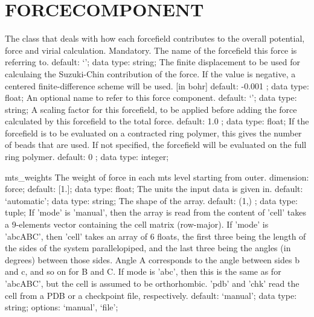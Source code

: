 \section{FORCECOMPONENT}
\label{FORCECOMPONENT}
\begin{ipifield}{}%
{The class that deals with how each forcefield contributes to the overall potential, force and virial calculation.}%
{}%
{%
{Mandatory. The name of the forcefield this force is referring to.}%
{default: `'; data type: string; }%
%
{The finite displacement to be used for calculaing the Suzuki-Chin contribution of the force. If the value is negative, a centered finite-difference scheme will be used. [in bohr]}%
{default:  -0.001 ; data type: float; }%
%
{An optional name to refer to this force component.}%
{default: `'; data type: string; }%
%
{A scaling factor for this forcefield, to be applied before adding the force calculated by this forcefield to the total force.}%
{default:  1.0 ; data type: float; }%
%
{If the forcefield is to be evaluated on a contracted ring polymer, this gives the number of beads that are used. If not specified, the forcefield will be evaluated on the full ring polymer.}%
{default:  0 ; data type: integer; }%
}
\begin{ipifield}{mts\_weights}%
{The weight of force in each mts level starting from outer.}%
{dimension: force; default: 
      [1.]; data type: float; }%
{%
{The units the input data is given in.}%
{default: `automatic'; data type: string; }%
%
{The shape of the array.}%
{default:  (1,) ; data type: tuple; }%
%
{If 'mode' is 'manual', then the array is read from the content of 'cell' takes a 9-elements vector containing the cell matrix (row-major). If 'mode' is 'abcABC', then 'cell' takes an array of 6 floats, the first three being the length of the sides of the system parallelopiped, and the last three being the angles (in degrees) between those sides. Angle A corresponds to the angle between sides b and c, and so on for B and C. If mode is 'abc', then this is the same as for 'abcABC', but the cell is assumed to be orthorhombic. 'pdb' and 'chk' read the cell from a PDB or a checkpoint file, respectively.}%
{default: `manual'; data type: string; options: `manual', `file'; }%
}
\end{ipifield}
\end{ipifield}
